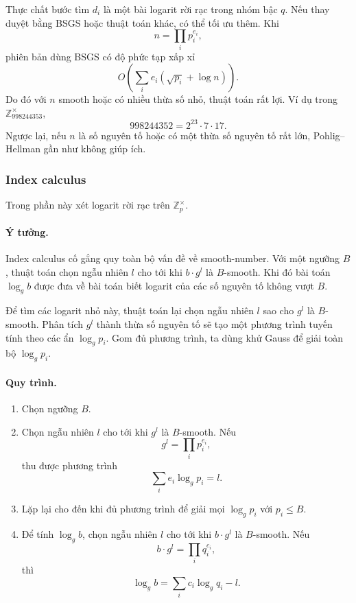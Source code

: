 \documentclass[11pt]{article}
\begin{document}
Thực chất bước tìm \(d_i\) là một bài logarit rời rạc trong nhóm bậc \(q\).
Nếu thay duyệt bằng BSGS hoặc thuật toán khác, có thể tối ưu thêm. Khi
\[
  n=\prod_i p_i^{e_i},
\]
phiên bản dùng BSGS có độ phức tạp xấp xỉ
\[
  O\!\left(\sum_i e_i(\sqrt{p_i}+\log n)\right).
\]
Do đó với \(n\) smooth hoặc có nhiều thừa số nhỏ, thuật toán rất lợi. Ví dụ
trong \(\mathbb Z_{998244353}^{\times}\),
\[
  998244352=2^{23}\cdot 7\cdot 17.
\]
Ngược lại, nếu \(n\) là số nguyên tố hoặc có một thừa số nguyên tố rất lớn,
Pohlig--Hellman gần như không giúp ích.

\subsubsection{Index calculus}

Trong phần này xét logarit rời rạc trên \(\mathbb Z_p^\times\).

\paragraph{Ý tưởng.}
Index calculus cố gắng quy toàn bộ vấn đề về smooth-number. Với một ngưỡng
\(B\), thuật toán chọn ngẫu nhiên \(l\) cho tới khi \(b\cdot g^l\) là
\(B\)-smooth. Khi đó bài toán \(\log_g b\) được đưa về bài toán biết logarit
của các số nguyên tố không vượt \(B\).

Để tìm các logarit nhỏ này, thuật toán lại chọn ngẫu nhiên \(l\) sao cho
\(g^l\) là \(B\)-smooth. Phân tích \(g^l\) thành thừa số nguyên tố sẽ tạo một
phương trình tuyến tính theo các ẩn \(\log_g p_i\). Gom đủ phương trình, ta
dùng khử Gauss để giải toàn bộ \(\log_g p_i\).

\paragraph{Quy trình.}
\begin{enumerate}
  \item Chọn ngưỡng \(B\).
  \item Chọn ngẫu nhiên \(l\) cho tới khi \(g^l\) là \(B\)-smooth. Nếu
  \[
    g^l=\prod_i p_i^{e_i},
  \]
  thu được phương trình
  \[
    \sum_i e_i\log_g p_i=l.
  \]
  \item Lặp lại cho đến khi đủ phương trình để giải mọi \(\log_g p_i\) với
  \(p_i\le B\).
  \item Để tính \(\log_g b\), chọn ngẫu nhiên \(l\) cho tới khi
  \(b\cdot g^l\) là \(B\)-smooth. Nếu
  \[
    b\cdot g^l=\prod_i q_i^{c_i},
  \]
  thì
  \[
    \log_g b=\sum_i c_i\log_g q_i-l.
  \]
\end{enumerate}
\end{document}
